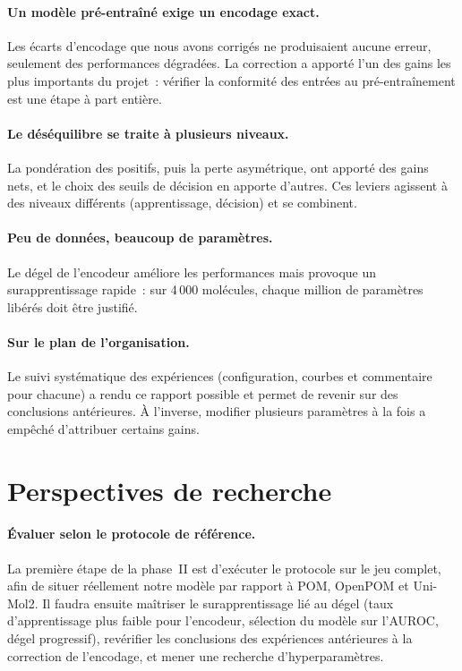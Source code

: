\paragraph{Un modèle pré-entraîné exige un encodage exact.}
Les écarts d'encodage que nous avons corrigés ne produisaient aucune erreur, seulement des performances dégradées.
La correction a apporté l'un des gains les plus importants du projet~: vérifier la conformité des entrées au pré-entraînement est une étape à part entière.

\paragraph{Le déséquilibre se traite à plusieurs niveaux.}
La pondération des positifs, puis la perte asymétrique, ont apporté des gains nets, et le choix des seuils de décision en apporte d'autres.
Ces leviers agissent à des niveaux différents (apprentissage, décision) et se combinent.

\paragraph{Peu de données, beaucoup de paramètres.}
Le dégel de l'encodeur améliore les performances mais provoque un surapprentissage rapide~: sur 4\,000 molécules, chaque million de paramètres libérés doit être justifié.

\paragraph{Sur le plan de l'organisation.}
Le suivi systématique des expériences (configuration, courbes et commentaire pour chacune) a rendu ce rapport possible et permet de revenir sur des conclusions antérieures.
À l'inverse, modifier plusieurs paramètres à la fois a empêché d'attribuer certains gains.


\section{Perspectives de recherche}
\label{sec:Perspectives}

\paragraph{Évaluer selon le protocole de référence.}
La première étape de la phase~II est d'exécuter le protocole sur le jeu complet, afin de situer réellement notre modèle par rapport à POM, OpenPOM et Uni-Mol2.
Il faudra ensuite maîtriser le surapprentissage lié au dégel (taux d'apprentissage plus faible pour l'encodeur, sélection du modèle sur l'AUROC, dégel progressif), revérifier les conclusions des expériences antérieures à la correction de l'encodage, et mener une recherche d'hyperparamètres.

